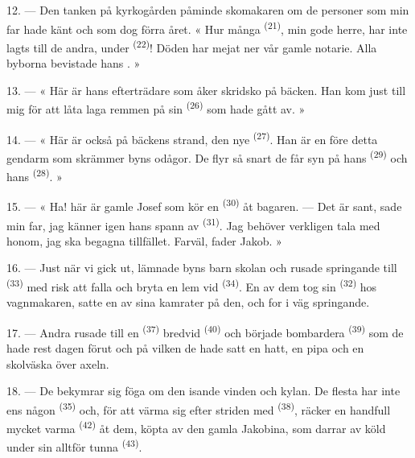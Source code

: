 12. --- Den tanken på kyrkogården påminde skomakaren om de personer som min far hade känt och
som dog förra året. « Hur många  \textsuperscript{(21)}, min gode herre, har
inte lagts till de andra, under
 \textsuperscript{(22)}! Döden har mejat ner vår gamle notarie.
Alla byborna bevistade hans . »

13. --- « Här är hans efterträdare som åker skridsko på bäcken. Han kom just till mig för att
låta laga remmen på sin  \textsuperscript{(26)} som hade gått av. »

14. --- « Här är också på bäckens strand, den nye 
\textsuperscript{(27)}. Han är en före detta gendarm som skrämmer byns odågor. De flyr så
snart de får syn på hans  \textsuperscript{(29)} och hans 
\textsuperscript{(28)}. »

15. --- « Ha! här är gamle Josef som kör en  \textsuperscript{(30)}
åt bagaren. --- Det är sant, sade min far, jag känner igen hans spann av 
\textsuperscript{(31)}. Jag behöver verkligen tala med honom, jag ska begagna tillfället.
Farväl, fader Jakob. »

16. --- Just när vi gick ut, lämnade byns barn skolan och rusade springande till
 \textsuperscript{(33)} med risk att falla och bryta en lem vid
 \textsuperscript{(34)}. En av dem tog sin 
\textsuperscript{(32)} hos vagnmakaren, satte en av sina kamrater på den, och for i väg
springande.

17. --- Andra rusade till en  \textsuperscript{(37)} bredvid
 \textsuperscript{(40)} och började bombardera 
\textsuperscript{(39)} som de hade rest dagen förut och på vilken de hade satt en hatt, en
pipa och en skolväska över axeln.

18. --- De bekymrar sig föga om den isande vinden och kylan. De flesta har inte ens någon
 \textsuperscript{(35)} och, för att värma sig efter striden med
 \textsuperscript{(38)}, räcker en handfull mycket varma 
\textsuperscript{(42)} åt dem, köpta av den gamla
 Jakobina, som darrar av köld under sin alltför tunna
 \textsuperscript{(43)}.

\VUsaut{3.0mm}
\VUsaut{3.0mm}

